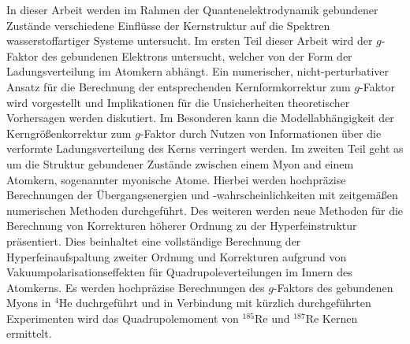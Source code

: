 
{
In dieser Arbeit werden im Rahmen der Quantenelektrodynamik gebundener Zustände verschiedene Einflüsse der Kernstruktur auf die Spektren wasserstoffartiger Systeme untersucht.
Im ersten Teil dieser Arbeit wird der $g$-Faktor des gebundenen Elektrons untersucht, welcher von der Form der Ladungsverteilung im Atomkern abhängt. Ein numerischer, nicht-perturbativer Ansatz für die Berechnung der entsprechenden Kernformkorrektur zum $g$-Faktor wird vorgestellt und Implikationen für die Unsicherheiten theoretischer Vorhersagen werden diskutiert. Im Besonderen kann die Modellabhängigkeit der Kerngrößenkorrektur zum $g$-Faktor durch Nutzen von Informationen über die verformte Ladungsverteilung des Kerns verringert werden.
Im zweiten Teil geht as um die Struktur gebundener Zustände zwischen einem Myon and einem Atomkern, sogenannter myonische Atome.
Hierbei werden hochpräzise Berechnungen der Übergangsenergien und -wahrscheinlichkeiten mit zeitgemäßen numerischen Methoden durchgeführt. Des weiteren werden neue Methoden für die Berechnung von Korrekturen höherer Ordnung zu der Hyperfeinstruktur präsentiert. Dies beinhaltet eine vollständige Berechnung der Hyperfeinaufspaltung zweiter Ordnung und Korrekturen aufgrund von Vakuumpolarisationseffekten für Quadrupoleverteilungen im Innern des Atomkerns.
Es werden hochpräzise Berechnungen des $g$-Faktors des gebundenen Myons in $^{4}$He duchrgeführt und in Verbindung mit kürzlich durchgeführten Experimenten wird das Quadrupolemoment von $^{185}$Re und $^{187}$Re Kernen ermittelt.
}
